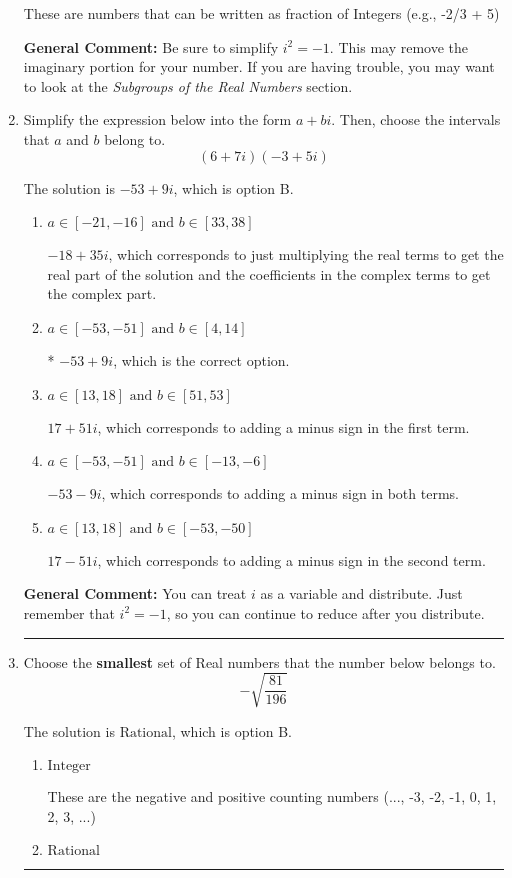 \documentclass{extbook}[14pt]
\newcommand{\litem}[1]{\item #1

\rule{\textwidth}{0.4pt}}
\begin{document}
\begin{enumerate}
{\begin{enumerate}[label=\Alph*.]
These are numbers that can be written as fraction of Integers (e.g., -2/3 + 5)
\end{enumerate}

\textbf{General Comment:} Be sure to simplify $i^2 = -1$. This may remove the imaginary portion for your number. If you are having trouble, you may want to look at the \textit{Subgroups of the Real Numbers} section.
}
\litem{
Simplify the expression below into the form $a+bi$. Then, choose the intervals that $a$ and $b$ belong to.
\[ (6 + 7 i)(-3 + 5 i) \]

The solution is \( -53 + 9 i \), which is option B.\begin{enumerate}[label=\Alph*.]
\item \( a \in [-21, -16] \text{ and } b \in [33, 38] \)

 $-18 + 35 i$, which corresponds to just multiplying the real terms to get the real part of the solution and the coefficients in the complex terms to get the complex part.
\item \( a \in [-53, -51] \text{ and } b \in [4, 14] \)

* $-53 + 9 i$, which is the correct option.
\item \( a \in [13, 18] \text{ and } b \in [51, 53] \)

 $17 + 51 i$, which corresponds to adding a minus sign in the first term.
\item \( a \in [-53, -51] \text{ and } b \in [-13, -6] \)

 $-53 - 9 i$, which corresponds to adding a minus sign in both terms.
\item \( a \in [13, 18] \text{ and } b \in [-53, -50] \)

 $17 - 51 i$, which corresponds to adding a minus sign in the second term.
\end{enumerate}

\textbf{General Comment:} You can treat $i$ as a variable and distribute. Just remember that $i^2=-1$, so you can continue to reduce after you distribute.
}
\litem{
Choose the \textbf{smallest} set of Real numbers that the number below belongs to.
\[ -\sqrt{\frac{81}{196}} \]

The solution is \( \text{Rational} \), which is option B.\begin{enumerate}[label=\Alph*.]
\item \( \text{Integer} \)

These are the negative and positive counting numbers (..., -3, -2, -1, 0, 1, 2, 3, ...)
\item \( \text{Rational} \)


\end{enumerate}}
\end{enumerate}
\end{document}
